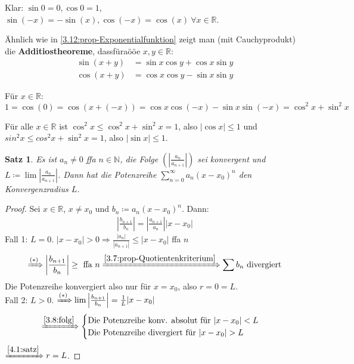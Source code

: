 \documentclass[titlepage,ngerman,a4paper,headsepline]{scrartcl}
\newcommand{\N}{\mathbb{N}}
\newcommand{\R}{\mathbb{R}}
\theoremstyle{named}
\theoremstyle{dotless}
\newtheorem{satz}[namedtheorem]{Satz}
\begin{document}
Klar: $\sin 0 = 0, \cos 0 = 1$, $\sin (-x) = - \sin(x), \cos(-x) = \cos(x) ~\forall x \in \R$.

Ähnlich wie in \ref{3.12:prop-Exponentialfunktion} zeigt man (mit Cauchyprodukt) die \textbf{Additiostheoreme}, dassfüraööe $x, y \in \R$:
\begin{align*}
	\sin(x+y) & = \sin x \cos y + \cos x \sin y \\
	\cos(x+y) & = \cos x \cos y - \sin x \sin y
\end{align*}

Für $x \in \R$:
	$$ 1 = \cos(0) = \cos( x + (-x) )= \cos x \cos(-x) - \sin x \sin(-x) = \cos^{2} x + \sin^{2} x $$

Für alle $x \in \R$ ist $\cos^{2} x \leq \cos^{2} x + \sin^{2} x = 1$, also $|\cos x | \leq 1$ und $sin^{2} x \leq cos^{2} x + \sin^{2} x = 1$, also $|\sin x | \leq 1$.


\begin{satz} \label{4.4:satz}
	Es ist $a_{n} \neq 0$ ffa $n \in \N$, die Folge $\left( \left| \frac{a_{n}}{a_{n+1}} \right| \right)$ sei konvergent und $L \coloneqq \lim \left| \frac{a_{n}}{a_{n+1}} \right|$. Dann hat die Potenzreihe $\sum_{n=0}^{\infty} a_{n} (x - x_{0})^{n}$ den Konvergenzradius $L$.
\end{satz}

\begin{proof}
	Sei $x \in \R$, $x \neq x_{0}$ und $b_{n} \coloneqq a_{n} (x - x_{0})^{n}$. Dann:
	\begin{align}
		 \left| \frac{b_{n+1}}{b_{n}} \right| = \left| \frac{a_{n+1}}{a_{n}} \right| |x - x_{0}| \tag{$*$}
	\end{align}
	Fall 1: $L = 0$. $|x - x_{0}| > 0 \Rightarrow \frac{|a_{n}|}{|a_{n+1}|} \leq | x - x_{0}|$ ffa $n$
	$$ \xRightarrow[]{(*)} \left| \frac{b_{n+1}}{b_{n}} \right| \geq \text{ ffa } n \xRightarrow[]{\ref{3.7:prop-Quotientenkriterium}} \sum b_{n} \text{ divergiert} $$
	Die Potenzreihe konvergiert also nur für $x = x_{0}$, also $r = 0 = L$. \\
	Fall 2: $L > 0$. $\xRightarrow[]{(*)} \lim \left| \frac{b_{n+1}}{b_{n}} \right| = \frac{1}{L} |x - x_{0}|$
	$$ \xRightarrow[]{\ref{3.8:folg}} \begin{cases}
		\text{Die Potenzreihe konv. absolut für } |x - x_{0}| < L \\
		\text{Die Potenzreihe divergiert für } |x - x_{0}| > L
	\end{cases} $$
	$\xRightarrow[]{\ref{4.1:satz}} r = L$.
\end{proof}
\end{document}
